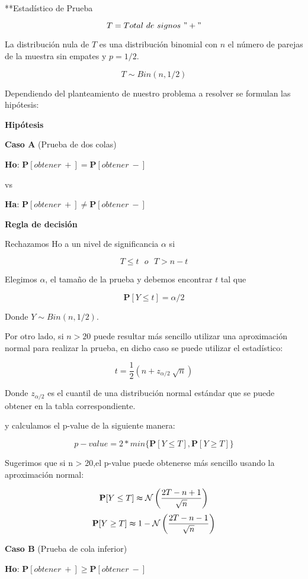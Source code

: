 \documentclass[a4paper,oneside,openany]{book}
\begin{document}
**Estadístico de Prueba

\[T=Total\ de\ signos\ "+"\]

La distribución nula de \(T\) es una distribución binomial con \(n\) el
número de parejas de la muestra sin empates y \(p=1/2\).

\[T\sim Bin(n,1/2)\]

Dependiendo del planteamiento de nuestro problema a resolver se formulan
las hipótesis:

\textbf{Hipótesis}

\textbf{Caso A} (Prueba de dos colas)

\textbf{Ho}: \(\mathbf{P}[obtener\ +]= \mathbf{P}[obtener\ -]\)

vs

\textbf{Ha}: \(\mathbf{P}[obtener\ +] \neq \mathbf{P}[obtener\ -]\)

\textbf{Regla de decisión}

Rechazamos Ho a un nivel de significancia \(\alpha\) si

\[T \leq t \ \ \  o \ \ \ T>n-t\]

Elegimos \(\alpha\), el tamaño de la prueba y debemos encontrar \(t\)
tal que

\[\mathbf{P}[Y \leq t]=\alpha/2\]

Donde \(Y \sim Bin (n,1/2)\).

Por otro lado, si \(n>20\) puede resultar más sencillo utilizar una
aproximación normal para realizar la prueba, en dicho caso se puede
utilizar el estadístico:

\[t=\frac{1}{2}\left(n+z_{\alpha/2}\ \sqrt{n}\right)\]

Donde \(z_{\alpha/2}\) es el cuantil de una distribución normal estándar
que se puede obtener en la tabla correspondiente.

y calculamos el p-value de la siguiente manera:

\[p-value=2*min\{\mathbf{P}[Y\leq T],\mathbf{P}[Y\geq T]\}\]

Sugerimos que si n \textgreater{} 20,el p-value puede obtenerse más
sencillo usando la aproximación normal:

\[\mathbf{P}[Y\leq T] \thickapprox  \mathcal{N} \left(\frac{2T-n+1}{\sqrt{n}}\right)\]
\[\mathbf{P}[Y\geq T] \thickapprox 1- \mathcal{N} \left(\frac{2T-n-1}{\sqrt{n}}\right)\]

\textbf{Caso B} (Prueba de cola inferior)

\textbf{Ho}: \(\mathbf{P}[obtener\ +] \geq \mathbf{P}[obtener\ -]\)
\end{document}
